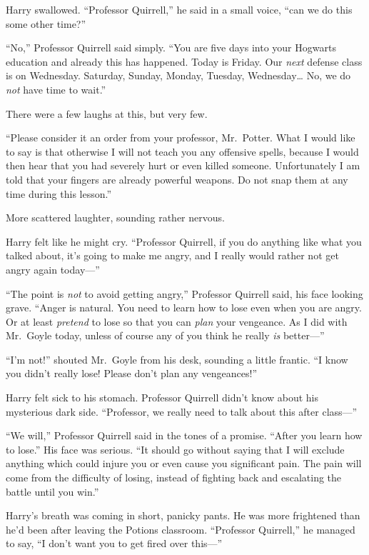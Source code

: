 Harry swallowed. ``Professor Quirrell,'' he said in a small voice, ``can
we do this some other time?''

``No,'' Professor Quirrell said simply. ``You are five days into your
Hogwarts education and already this has happened. Today is Friday. Our
\emph{next} defense class is on Wednesday. Saturday, Sunday, Monday,
Tuesday, Wednesday\ldots{} No, we do \emph{not} have time to wait.''

There were a few laughs at this, but very few.

``Please consider it an order from your professor, Mr.~Potter. What I
would like to say is that otherwise I will not teach you any offensive
spells, because I would then hear that you had severely hurt or even
killed someone. Unfortunately I am told that your fingers are already
powerful weapons. Do not snap them at any time during this lesson.''

More scattered laughter, sounding rather nervous.

Harry felt like he might cry. ``Professor Quirrell, if you do anything
like what you talked about, it's going to make me angry, and I really
would rather not get angry again today---''

``The point is \emph{not} to avoid getting angry,'' Professor Quirrell
said, his face looking grave. ``Anger is natural. You need to learn how
to lose even when you are angry. Or at least \emph{pretend} to lose so
that you can \emph{plan} your vengeance. As I did with Mr.~Goyle today,
unless of course any of you think he really \emph{is} better---''

``I'm not!'' shouted Mr.~Goyle from his desk, sounding a little frantic.
``I know you didn't really lose! Please don't plan any vengeances!''

Harry felt sick to his stomach. Professor Quirrell didn't know about his
mysterious dark side. ``Professor, we really need to talk about this
after class---''

``We will,'' Professor Quirrell said in the tones of a promise. ``After
you learn how to lose.'' His face was serious. ``It should go without
saying that I will exclude anything which could injure you or even cause
you significant pain. The pain will come from the difficulty of losing,
instead of fighting back and escalating the battle until you win.''

Harry's breath was coming in short, panicky pants. He was more
frightened than he'd been after leaving the Potions classroom.
``Professor Quirrell,'' he managed to say, ``I don't want you to get
fired over this---''

